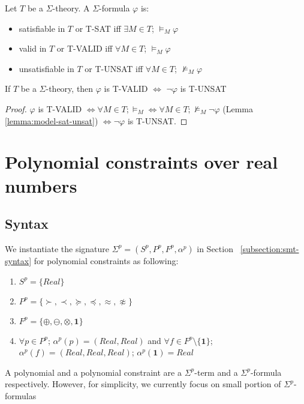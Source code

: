 \begin{definition}
Let $T$ be a $\Sigma$-theory. A $\Sigma$-formula $\varphi$ is:
\begin{itemize}
\item satisfiable in $T$ or T-SAT iff $\exists M \in T$; $\models_{M} \varphi$
\item valid in $T$ or T-VALID iff $\forall M \in T$; $\models_{M} \varphi$
\item unsatisfiable in $T$ or T-UNSAT iff $\forall M \in T$; $\not\models_{M} \varphi$
\end{itemize}
\end{definition}

\begin{lemma} \label{lemma:theory-valid-unsat}
If $T$ be a $\Sigma$-theory, then $\varphi$ is T-VALID $\iff$ $\neg\varphi$ is T-UNSAT
\end{lemma}

\begin{proof}
$\varphi$ is T-VALID $\iff \forall M \in T; \models_{M} \iff \forall M \in T; \not\models_{M} \neg\varphi$ (Lemma \ref{lemma:model-sat-unsat}) $\iff \neg\varphi$ is T-UNSAT.
\end{proof}

\section{Polynomial constraints over real numbers}
\subsection{Syntax}
We instantiate the signature $\Sigma^p = (S^p, P^p, F^p, \alpha^p)$ in Section ~\ref{subsection:smt-syntax} for polynomial constraints as following:
\begin{enumerate}
\item $S^p = \{Real\}$
\item $P^p = \{\succ, \prec, \succeq, \preceq, \approx, \not\approx\}$
\item $F^p = \{\oplus, \ominus, \otimes, \mathbf{1}\}$
\item $\forall p \in P^p$; $\alpha^p(p) = (Real, Real)$ and $\forall f \in F^p\setminus \{\mathbf{1}\}$; $\alpha^p(f) = (Real, Real, Real)$; $\alpha^p(\mathbf{1})=Real$
\end{enumerate}
A polynomial and a polynomial constraint are a $\Sigma^p$-term and a $\Sigma^p$-formula respectively. However, for simplicity, we currently focus on small portion of $\Sigma^p$-formulas


